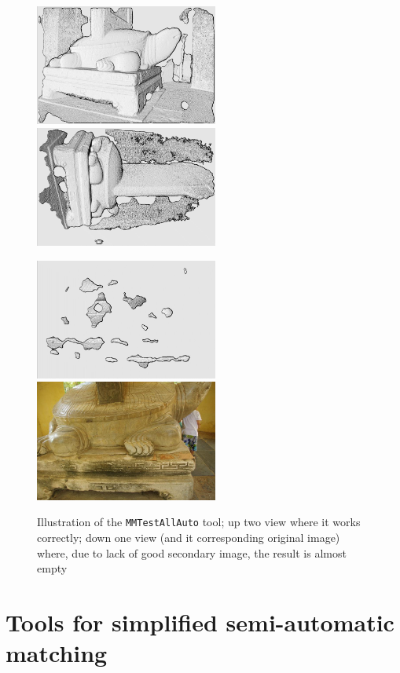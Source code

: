 \begin{figure}
\begin{center}
\includegraphics[width=60mm]{FIGS/Tortue/Dep1.jpg}
\includegraphics[width=60mm]{FIGS/Tortue/Dep2.jpg}

\includegraphics[width=60mm]{FIGS/Tortue/Dep3.jpg}
\includegraphics[width=60mm]{FIGS/Tortue/RIMGP6900.JPG}
\end{center}
\caption{Illustration of the {\tt MMTestAllAuto} tool; up two view where it works correctly;
down one view (and it corresponding original image) where, due to lack of good secondary image, 
the result is almost empty}
\label{FIG:Tortue:AllAuto}
\end{figure}


\section{Tools for simplified semi-automatic matching}

